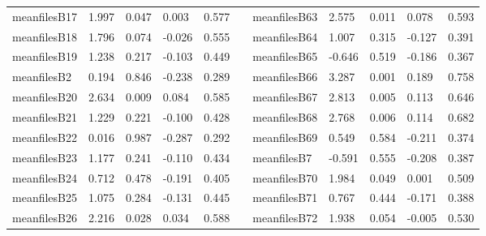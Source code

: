 \begin{table}[h!]
\begin{tabular}{lllllllllll}
meanfilesB17  & 1.997            & 0.047            & 0.003               & 0.577               &           & meanfilesB63  & 2.575            & 0.011            & 0.078               & 0.593               \\
meanfilesB18  & 1.796            & 0.074            & -0.026              & 0.555               &           & meanfilesB64  & 1.007            & 0.315            & -0.127              & 0.391               \\
meanfilesB19  & 1.238            & 0.217            & -0.103              & 0.449               &           & meanfilesB65  & -0.646           & 0.519            & -0.186              & 0.367               \\
meanfilesB2   & 0.194            & 0.846            & -0.238              & 0.289               &           & meanfilesB66  & 3.287            & 0.001            & 0.189               & 0.758               \\
meanfilesB20  & 2.634            & 0.009            & 0.084               & 0.585               &           & meanfilesB67  & 2.813            & 0.005            & 0.113               & 0.646               \\
meanfilesB21  & 1.229            & 0.221            & -0.100              & 0.428               &           & meanfilesB68  & 2.768            & 0.006            & 0.114               & 0.682               \\
meanfilesB22  & 0.016            & 0.987            & -0.287              & 0.292               &           & meanfilesB69  & 0.549            & 0.584            & -0.211              & 0.374               \\
meanfilesB23  & 1.177            & 0.241            & -0.110              & 0.434               &           & meanfilesB7   & -0.591           & 0.555            & -0.208              & 0.387               \\
meanfilesB24  & 0.712            & 0.478            & -0.191              & 0.405               &           & meanfilesB70  & 1.984            & 0.049            & 0.001               & 0.509               \\
meanfilesB25  & 1.075            & 0.284            & -0.131              & 0.445               &           & meanfilesB71  & 0.767            & 0.444            & -0.171              & 0.388               \\
meanfilesB26  & 2.216            & 0.028            & 0.034               & 0.588               &           & meanfilesB72  & 1.938            & 0.054            & -0.005              & 0.530               \\

\end{tabular}
\end{table}
